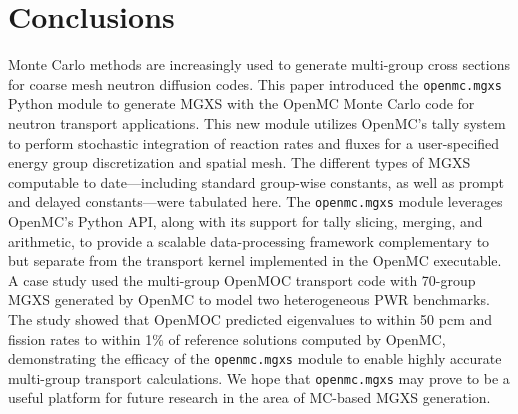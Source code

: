 \section{Conclusions}
\label{sec:conclusions}

Monte Carlo methods are increasingly used to generate multi-group cross sections for coarse mesh neutron diffusion codes. This paper introduced the \texttt{openmc.mgxs} Python module to generate MGXS with the OpenMC Monte Carlo code for neutron transport applications. This new module utilizes OpenMC's tally system to perform stochastic integration of reaction rates and fluxes for a user-specified energy group discretization and spatial mesh. The different types of MGXS computable to date---including standard group-wise constants, as well as prompt and delayed constants---were tabulated here. The \texttt{openmc.mgxs} module leverages OpenMC's Python API, along with its support for tally slicing, merging, and arithmetic, to provide a scalable data-processing framework complementary to but separate from the transport kernel implemented in the OpenMC executable. A case study used the multi-group OpenMOC transport code with 70-group MGXS generated by OpenMC to model two heterogeneous PWR benchmarks. The study showed that OpenMOC predicted eigenvalues to within 50 pcm and fission rates to within 1\% of reference solutions computed by OpenMC, demonstrating the efficacy of the \texttt{openmc.mgxs} module to enable highly accurate multi-group transport calculations. We hope that \texttt{openmc.mgxs} may prove to be a useful platform for future research in the area of MC-based MGXS generation.

